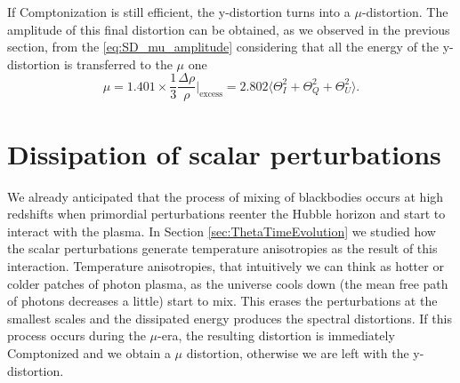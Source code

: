 If Comptonization is still efficient, the y-distortion turns into a $\mu$-distortion. The amplitude of this final distortion can be obtained, as we observed in the previous section, from the \eqref{eq:SD_mu_amplitude} considering that all the energy of the y-distortion is transferred to the $\mu$ one
\begin{equation}
    \label{eq:mu-distortion_polarized}
    \mu=1.401\times\frac{1}{3}\frac{\Delta\rho}{\rho}\bigg|_\text{excess}=2.802\Big\langle\Theta^2_I+\Theta^2_Q+\Theta^2_U\Big\rangle.
\end{equation}

\section{Dissipation of scalar perturbations}
\label{sec:diss_scalar}
We already anticipated that the process of mixing of blackbodies occurs at high redshifts when primordial perturbations reenter the Hubble horizon and start to interact with the plasma. In Section \ref{sec:ThetaTimeEvolution} we studied how the scalar perturbations generate temperature anisotropies as the result of this interaction. Temperature anisotropies, that intuitively we can think as hotter or colder patches of photon plasma, as the universe cools down (the mean free path of photons decreases a little) start to mix. This erases the perturbations at the smallest scales and the dissipated energy produces the spectral distortions. If this process occurs during the $\mu$-era, the resulting distortion is immediately Comptonized and we obtain a $\mu$ distortion, otherwise we are left with the y-distortion.

